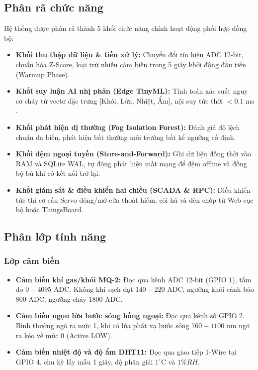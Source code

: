 \subsection{Phân rã chức năng}
Hệ thống được phân rã thành 5 khối chức năng chính hoạt động phối hợp đồng bộ:
\begin{itemize}
    \item \textbf{Khối thu thập dữ liệu \& tiền xử lý:} Chuyển đổi tín hiệu ADC 12-bit, chuẩn hóa Z-Score, loại trừ nhiễu cảm biến trong 5 giây khởi động đầu tiên (Warmup Phase).
    \item \textbf{Khối suy luận AI nhị phân (Edge TinyML):} Tính toán xác suất nguy cơ cháy từ vectơ đặc trưng [Khói, Lửa, Nhiệt, Ẩm], nội suy tức thời $<0.1\text{ ms}$.
    \item \textbf{Khối phát hiện dị thường (Fog Isolation Forest):} Đánh giá độ lệch chuẩn đa biến, phát hiện bất thường môi trường bất kể ngưỡng cố định.
    \item \textbf{Khối đệm ngoại tuyến (Store-and-Forward):} Ghi dữ liệu đồng thời vào RAM và SQLite WAL, tự động phát hiện mất mạng để đệm offline và đồng bộ bù khi có kết nối trở lại.
    \item \textbf{Khối giám sát \& điều khiển hai chiều (SCADA \& RPC):} Điều khiển tức thì cơ cấu Servo đóng/mở cửa thoát hiểm, còi hú và đèn chớp từ Web cục bộ hoặc ThingsBoard.
\end{itemize}
\subsection{Phân lớp tính năng}
\subsubsection{Lớp cảm biến}
\begin{itemize}
    \item \textbf{Cảm biến khí gas/khói MQ-2:} Đọc qua kênh ADC 12-bit (GPIO 1), tầm đo $0 - 4095\text{ ADC}$. Không khí sạch đạt $140 - 220\text{ ADC}$, ngưỡng khói cảnh báo $800\text{ ADC}$, ngưỡng cháy $1800\text{ ADC}$.
    \item \textbf{Cảm biến ngọn lửa bước sóng hồng ngoại:} Đọc qua kênh số GPIO 2. Bình thường ngõ ra mức 1, khi có lửa phát xạ bước sóng $760 - 1100\text{ nm}$ ngõ ra kéo về mức 0 (Active LOW).
    \item \textbf{Cảm biến nhiệt độ và độ ẩm DHT11:} Đọc qua giao tiếp 1-Wire tại GPIO 4, chu kỳ lấy mẫu 1 giây, độ phân giải $1^\circ\text{C}$ và $1\% RH$.
\end{itemize}
